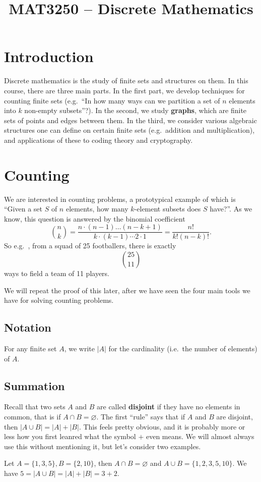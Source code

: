 \documentclass{amsart}
\title{MAT3250 -- Discrete Mathematics}
\begin{document}
	\maketitle
	\section{Introduction}
	Discrete mathematics is the study of finite sets and structures on them.
	In this course, there are three main parts.
	In the first part, we develop techniques for counting finite sets (e.g.~``In how many ways can we partition a set of $n$ elements into $k$ non-empty subsets''?).
	In the second, we study \textbf{graphs}, which are finite sets of points and edges between them.
	In the third, we consider various algebraic structures one can define on certain finite sets (e.g.~addition and multiplication), and applications of these to coding theory and cryptography.
	
	\section{Counting}
	We are interested in counting problems, a prototypical example of which is ``Given a set $S$ of $n$ elements, how many $k$-element subsets does $S$ have?''.
	As we know, this question is answered by the binomial coefficient
	\[
	\binom{n}{k} = \frac{n \cdot (n-1) \dots (n-k+1)}{k \cdot (k-1) \cdots 2 \cdot 1} = \frac{n!}{k!(n-k)!}.
	\]
	So e.g.~, from a squad of 25 footballers, there is exactly 
	\[
	\binom{25}{11}
	\]
	ways to field a team of 11 players.
	
	We will repeat the proof of this later, after we have seen the four main tools we have for solving counting problems.
	
	\subsection{Notation}
	For any finite set $A$, we write $|A|$ for the cardinality (i.e.~the number of elements) of $A$.
	
	\subsection{Summation}
	Recall that two sets $A$ and $B$ are called \textbf{disjoint} if they have no elements in common, that is if $A \cap B = \varnothing$.
	The first ``rule'' says that if $A$ and $B$ are disjoint, then $|A \cup B| = |A| + |B|$.
	This feels pretty obvious, and it is probably more or less how you first leanred what the symbol $+$ even means. 
	We will almost always use this without mentioning it, but let's consider two examples.
	\begin{nex}
		Let $A = \{1, 3, 5\}, B = \{2, 10\}$, then $A \cap B = \varnothing$ and $A \cup B = \{1, 2, 3, 5, 10\}$.
		We have $5 = |A \cup B| = |A| + |B| = 3 + 2$.
	\end{nex}
	
\end{document}
